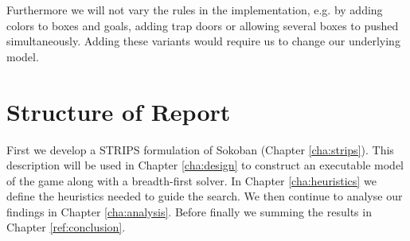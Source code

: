 Furthermore we will not vary the rules in the implementation, e.g. by
adding colors to boxes and goals, adding trap doors or allowing
several boxes to pushed simultaneously. Adding these variants would
require us to change our underlying model.

\section{Structure of Report}


First we develop a STRIPS formulation of Sokoban (Chapter
\ref{cha:strips}). This description will be used in Chapter
\ref{cha:design} to construct an executable model of the game along
with a breadth-first solver. In Chapter \ref{cha:heuristics} we define
the heuristics needed to guide the search. We then continue to analyse
our findings in Chapter \ref{cha:analysis}. Before finally we summing
the results in Chapter \ref{ref:conclusion}.


